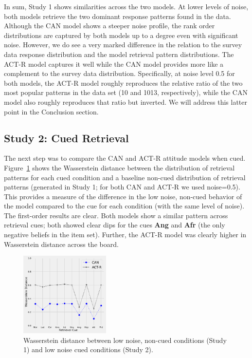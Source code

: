 \documentclass[10pt,letterpaper]{article}
\begin{document}
In sum, Study 1 shows similarities across the two models.  At lower levels of noise, both models retrieve the two dominant response patterns found in the data.  Although the CAN model shows a steeper noise profile, the rank order distributions are captured by both models up to a degree even with significant noise.  However, we do see a very marked difference in the relation to the survey data response distribution and the model retrieval pattern distributions.  The ACT-R model captures it well while the CAN model provides more like a complement to the survey data distribution. Specifically, at noise level 0.5 for both models, the ACT-R model roughly reproduces the relative ratio of the two most popular patterns in the data set (10 and 1013, respectively), while the CAN model also roughly reproduces that ratio but inverted. We will address this latter point in the Conclusion section.

\subsection{Study 2: Cued Retrieval}
The next step was to compare the CAN and ACT-R attitude models when cued.  Figure~\ref{CuedWass-figure} shows the Wasserstein distance between the distribution of retrieval patterns for each cued condition and a baseline non-cued distribution of retrieval patterns (generated in Study 1; for both CAN and ACT-R we used noise=0.5). This provides a measure of the difference in the low noise, non-cued behavior of the model compared to the cue for each condition (with the same level of noise).  The first-order results are clear.  Both models show a similar pattern across retrieval cues; both showed clear dips for the cues \textbf{Ang} and \textbf{Afr} (the only negative beliefs in the item set).  Further, the ACT-R model was clearly higher in Wasserstein distance across the board.  

\begin{figure}[H]
\begin{center}
\includegraphics[width=0.4\textwidth,height=0.3\textwidth]{Cued_WASS_CAN-IBL.png}
\end{center}
\caption{Wasserstein distance between low noise, non-cued conditions (Study 1) and low noise cued conditions (Study 2). } 
\label{CuedWass-figure}
\end{figure}
\end{document}
